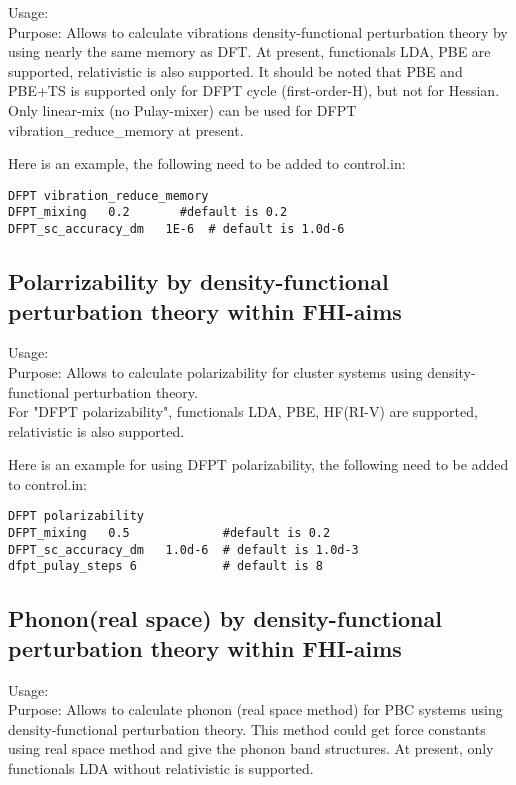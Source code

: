 {
Usage:  \\[1.0em]
  Purpose: Allows to calculate vibrations density-functional perturbation theory by using nearly the same memory as DFT.  At present, functionals LDA, PBE are supported, relativistic is also supported. It should be noted that PBE and PBE+TS is supported only for DFPT cycle (first-order-H), but not for Hessian.  Only linear-mix (no Pulay-mixer) can be used for DFPT vibration\_reduce\_memory at present.\\ }

Here is an example,  the following need to be added to control.in:
\begin{verbatim} 
DFPT vibration_reduce_memory
DFPT_mixing   0.2       #default is 0.2
DFPT_sc_accuracy_dm   1E-6  # default is 1.0d-6
\end{verbatim}  



\subsection*{Polarrizability by density-functional perturbation theory within FHI-aims}
{
Usage:  \\[1.0em]
  Purpose: Allows to calculate polarizability for cluster systems using density-functional perturbation theory.\\  For "DFPT polarizability", functionals LDA, PBE, HF(RI-V) are supported, relativistic is also supported.  }
  
Here is an example for using DFPT polarizability,  the following need to be added to control.in:
\begin{verbatim} 
DFPT polarizability
DFPT_mixing   0.5             #default is 0.2
DFPT_sc_accuracy_dm   1.0d-6  # default is 1.0d-3
dfpt_pulay_steps 6            # default is 8
\end{verbatim}  



\subsection*{Phonon(real space) by density-functional perturbation theory within FHI-aims}
{
Usage:  \\[1.0em]
  Purpose: Allows to calculate phonon (real space method) for PBC systems using density-functional perturbation theory. This method could get force constants using real space method and give the phonon band structures. At present, only functionals LDA without relativistic is supported.\\ }

